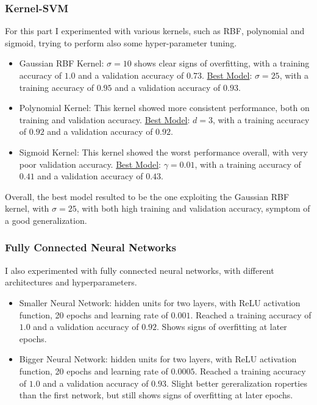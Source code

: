 \documentclass[a4paper, 10pt]{article}
\begin{document}
\subsubsection{Kernel-SVM}
For this part I experimented with various kernels, such as RBF, polynomial and sigmoid, trying to perform also some hyper-parameter tuning.
\begin{itemize}
    \item Gaussian RBF Kernel:
        \subitem $\sigma = 10$ shows clear signs of overfitting, with a training accuracy of $1.0$ and a validation accuracy of $0.73$.
        \subitem \underline{Best Model}: $\sigma = 25$, with a training accuracy of $0.95$ and a validation accuracy of $0.93$.
    \item Polynomial Kernel:
        \subitem This kernel showed more consistent performance, both on training and validation accuracy.
        \subitem \underline{Best Model}: $d = 3$, with a training accuracy of $0.92$ and a validation accuracy of $0.92$.
    \item Sigmoid Kernel:
        \subitem This kernel showed the worst performance overall, with very poor validation accuracy.
        \subitem \underline{Best Model}: $\gamma = 0.01$, with a training accuracy of $0.41$ and a validation accuracy of $0.43$.
\end{itemize}
Overall, the best model resulted to be the one exploiting the Gaussian RBF kernel, with $\sigma = 25$, with both high training and validation accuracy, symptom
of a good generalization.

\subsubsection{Fully Connected Neural Networks}
I also experimented with fully connected neural networks, with different architectures and hyperparameters.

\begin{itemize}
    \item Smaller Neural Network:
         hidden units for two layers, with ReLU activation function, 20 epochs and learning rate of $0.001$.
        \subitem Reached a training accuracy of $1.0$ and a validation accuracy of $0.92$.
        \subitem Shows signs of overfitting at later epochs.
    \item Bigger Neural Network:
         hidden units for two layers, with ReLU activation function, 20 epochs and learning rate of $0.0005$.
        \subitem Reached a training accuracy of $1.0$ and a validation accuracy of $0.93$.
        \subitem Slight better gereralization roperties than the first network, but still shows signs of overfitting at later epochs.
\end{itemize}
\end{document}

